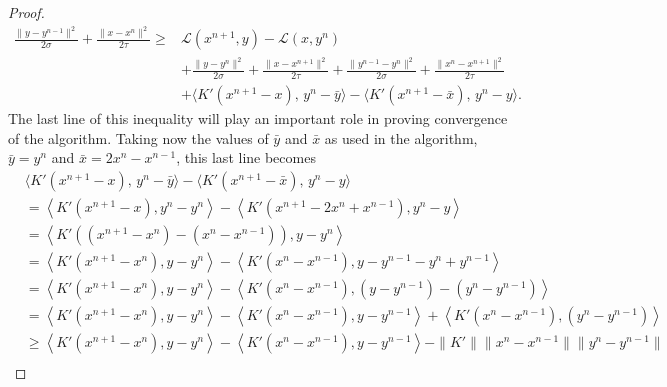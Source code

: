 \documentclass[twoside,12pt,openright]{report}  %
\begin{document}
\begin{proof}
    \begin{align*}
    \frac{\|y-y^{n-1}\|^2}{2\sigma}+\frac{\|x-x^n\|^2}{2\tau} \geq& \mathcal{L}(x^{n+1},y)- \mathcal{L}(x,y^n)\\ &+ \frac{\|y-y^{n}\|^2}{2\sigma}+\frac{\|x-x^{n+1}\|^2}{2\tau} + \frac{\|y^{n-1}-y^{n}\|^2}{2\sigma}+\frac{\|x^n-x^{n+1}\|^2}{2\tau}\\ &+ \langle K' (x^{n+1} - x),\, y^{n} - \bar{y}\rangle - \langle K' (x^{n+1}-\bar{x}),\,y^{n} -y \rangle.
    \end{align*}
    The last line of this inequality will play an important role in proving convergence of the algorithm. Taking now the values of $\bar{y}$ and $\bar{x}$ as used in the algorithm, $\bar{y}=y^n$ and $\bar{x}=2x^{n}-x^{n-1}$, this last line becomes
    \begin{align*}
        &\langle K' (x^{n+1} - x),\, y^{n} - \bar{y}\rangle - \langle K' (x^{n+1}-\bar{x}),\,y^{n} -y \rangle \\
        &=\left \langle K'(x^{n+1}-x), y^{n}-y^n\right \rangle - \left \langle K'(x^{n+1}-2x^n+x^{n-1}), y^{n}-y\right \rangle \\
        &= \left \langle K'((x^{n+1}-x^n)-(x^n-x^{n-1})), y-y^{n}\right \rangle \\
        &= \left \langle K'(x^{n+1}-x^n), y-y^{n}\right \rangle - \left \langle K'(x^n-x^{n-1}), y-y^{n-1}-y^{n}+y^{n-1}\right \rangle\\
        &= \left \langle K'(x^{n+1}-x^n), y-y^{n}\right \rangle - \left \langle K'(x^n-x^{n-1}), (y-y^{n-1})-(y^{n}-y^{n-1})\right \rangle\\
        &= \left \langle K'(x^{n+1}-x^n), y-y^{n}\right \rangle - \left \langle K'(x^n-x^{n-1}), y-y^{n-1}\right \rangle + \left \langle K'(x^n-x^{n-1}), (y^{n}-y^{n-1})\right \rangle\\
        &\ge \left \langle K'(x^{n+1}-x^n), y-y^{n}\right \rangle - \left \langle K'(x^n-x^{n-1}), y-y^{n-1}\right \rangle - \|K'\|\|x^n-x^{n-1}\|\|y^{n}-y^{n-1}\|\\
    \end{align*}


\end{proof}
\end{document}
